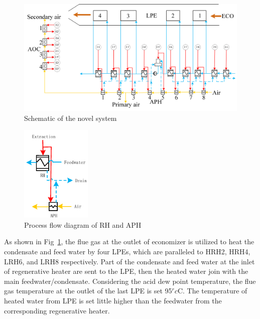 \documentclass[preprint,12pt]{elsarticle}
\begin{document}
\begin{figure}[htbp]
\centering
\includegraphics[width=1\textwidth]{fig/novel_system.png}
\caption{Schematic of the novel system} 
\label{fig:novel_system}
\end{figure}

\begin{figure}[htbp]
\centering
\includegraphics[width=0.3\textwidth]{fig/extraction_heat_APH}%
\caption{Process flow diagram of RH and APH} 
\label{fig:extraction_heat_APH}
\end{figure}
As shown in Fig~\ref{fig:novel_system}, the flue gas at the outlet of economizer is utilized to heat the condensate and feed water by four LPEs, which are paralleled to HRH2, HRH4, LRH6, and LRH8 respectively. 
Part of the condensate and feed water at the inlet of regenerative heater are sent to the LPE, then the heated water join with the main feedwater/condensate. 
Considering the acid dew point temperature, the flue gas temperature at the outlet of the last LPE is set 95$^	rc$C. 
The temperature of heated water from LPE is set little higher than the feedwater from the corresponding regenerative heater.%

\end{document}
